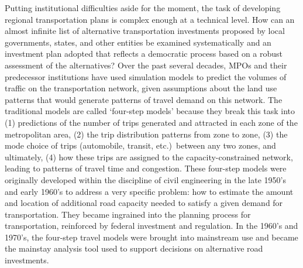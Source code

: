Putting institutional difficulties aside for the moment, the task of
developing regional transportation plans is complex enough at a technical
level.  How can an almost infinite list of alternative transportation
investments proposed by local governments, states, and other entities be
examined systematically and an investment plan adopted that reflects a
democratic process based on a robust assessment of the alternatives?  Over
the past several decades, MPOs and their predecessor institutions have used
simulation models to predict the volumes of traffic on the transportation
network, given assumptions about the land use patterns that would generate
patterns of travel demand on this network.  The traditional models are
called `four-step models' because they break this task into (1) predictions
of the number of trips generated and attracted in each zone of the
metropolitan area, (2) the trip distribution patterns from zone to zone,
(3) the mode choice of trips (automobile, transit, etc.)\ between
any two zones, and ultimately, (4) how
these trips are assigned to the capacity-constrained network, leading to
patterns of travel time and congestion.  These four-step models were
originally developed within the discipline of civil engineering in the late
1950's and early 1960's to address a very specific problem: how to estimate
the amount and location of additional road capacity needed to satisfy a
given demand for transportation. They became ingrained into the planning
process for transportation, reinforced by federal investment and
regulation.  In the 1960's and 1970's, the four-step travel models were
brought into mainstream use and became the mainstay analysis tool used to
support decisions on alternative road investments.


